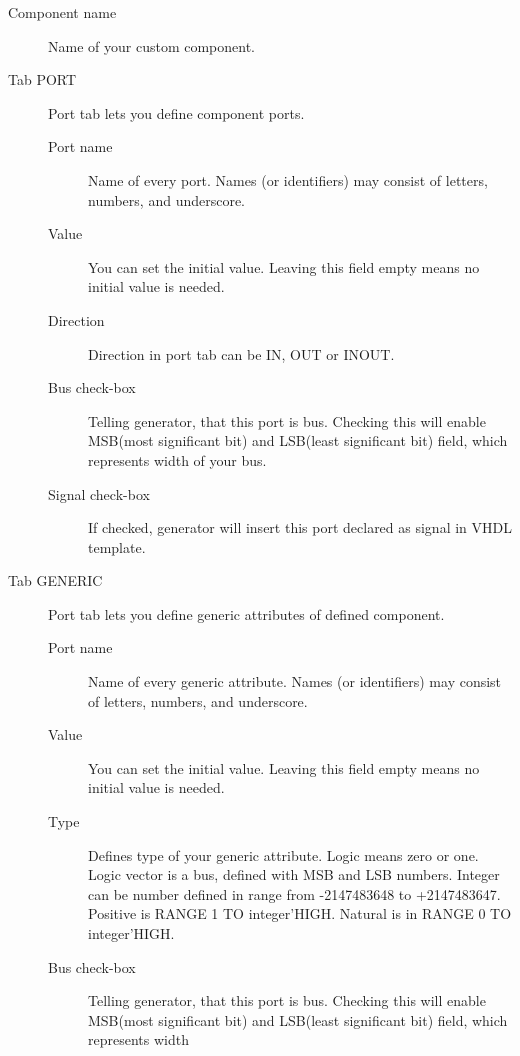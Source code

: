     \begin{description}
        \item [Component name]
            Name of your custom component.
        \item[Tab PORT]
            Port tab lets you define component ports.
            \begin{description}
                \item[Port name]
                    Name of every port. Names (or identifiers) may consist of letters, numbers, and underscore.
                \item [Value]
                    You can set the initial value. Leaving this field empty means no initial value is needed.
                \item [Direction]
                    Direction in port tab can be IN, OUT or INOUT.
                \item [Bus check-box]
                    Telling generator, that this port is bus. Checking this will enable MSB(most significant bit) and LSB(least significant bit) field, which represents width of your bus.
                \item [Signal check-box]
                    If checked, generator will insert this port declared as signal in VHDL template.
            \end{description}
        \item[Tab GENERIC]
            Port tab lets you define generic attributes of defined component.
            \begin{description}
                \item[Port name]
                    Name of every generic attribute. Names (or identifiers) may consist of letters, numbers, and underscore.
                \item [Value]
                    You can set the initial value. Leaving this field empty means no initial value is needed.
                \item [Type]
                    Defines type of your generic attribute. Logic means zero or one. Logic vector is a bus, defined with MSB and LSB numbers.
                    Integer can be number defined in range from -2147483648 to +2147483647. Positive is RANGE 1 TO integer’HIGH. Natural is in RANGE 0 TO integer’HIGH.
                \item [Bus check-box]
                    Telling generator, that this port is bus. Checking this will enable MSB(most significant bit) and LSB(least significant bit) field, which represents width

\end{description}
\end{description}
